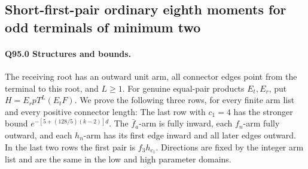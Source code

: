 \subsection{Short-first-pair ordinary eighth moments for odd terminals of minimum two}\label{proof:Q5-C095}

\paragraph{Q95.0 Structures and bounds.}
The receiving root has an outward unit arm, all connector edges point
from the terminal to this root, and \(L\ge\allowbreak 1\). For genuine equal-pair
products \(E_t,\allowbreak E_r\), put \(H=\allowbreak E_rpT^L(E_tF)\). We prove the following
three rows, for every finite arm list and every positive connector length:
The last row with \(c_1=\allowbreak 4\) has the stronger bound
\(e^{-[5+(128/5)(k-2)]d}\).
The \(\bar f_a\)-arm is fully inward, each \(f_n\)-arm fully outward,
and each \(h_n\)-arm has its first edge inward and all later edges
outward. In the last two rows the first pair is \(f_3h_{c_1}\).
Directions are fixed by the integer arm list and are the same in
the low and high parameter domains.

